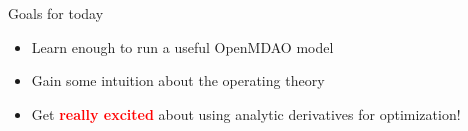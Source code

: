 \documentclass[aspectratio=169, usenames,dvipsnames, 14pt]{beamer}
\begin{document}
\begin{frame}{Goals for today}
    \begin{itemize}
        \item Learn enough to run a useful OpenMDAO model
        \vspace{.5cm}
        \item Gain some intuition about the operating theory
        \vspace{.5cm}
        \item Get \textcolor{red}{\textbf{really excited}} about using analytic derivatives for optimization!

    \end{itemize}
    
\end{frame}
\end{document}
